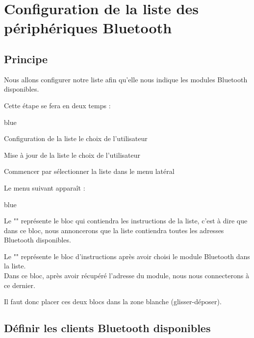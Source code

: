 \section{Configuration de la liste des périphériques Bluetooth}

\subsection{Principe}

Nous allons configurer notre liste  afin qu'elle nous indique les modules Bluetooth disponibles.

Cette étape se fera en deux temps : 

\begin{items}{blue}{\Triangle}
    \item Configuration de la liste  le choix de l'utilisateur
    \item Mise à jour de la liste  le choix de l'utilisateur
\end{items}


Commencer par sélectionner la liste  dans le menu latéral


Le menu suivant apparaît : \\


\begin{items}{blue}{\Triangle}
    \item Le "" représente le bloc qui contiendra les instructions de la liste, c'est à dire que dans ce bloc, nous annoncerons que la liste contiendra toutes les adresses Bluetooth disponibles.
    \item Le "" représente le bloc d'instructions après avoir choisi le module Bluetooth dans la liste. \\Dans ce bloc, après avoir récupéré l'adresse du module, nous nous connecterons à ce dernier.
\end{items}

Il faut donc placer ces deux blocs dans la zone blanche (glisser-déposer).

\subsection{Définir les clients Bluetooth disponibles}


